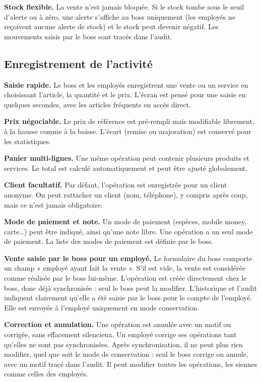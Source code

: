 \documentclass[11pt,a4paper]{article}
\newcommand{\fonc}[2]{\textbf{#1.} #2\par\vspace{0.2em}}
\begin{document}
	\fonc{Stock flexible}{La vente n'est jamais bloquée. Si le stock tombe sous le seuil d'alerte ou à zéro, une alerte s'affiche au boss uniquement (les employés ne reçoivent aucune alerte de stock) et le stock peut devenir négatif. Les mouvements saisis par le boss sont tracés dans l'audit.}

	\subsection{Enregistrement de l'activité}

	\fonc{Saisie rapide}{Le boss et les employés enregistrent une vente ou un service en choisissant l'article, la quantité et le prix. L'écran est pensé pour une saisie en quelques secondes, avec les articles fréquents en accès direct.}

	\fonc{Prix négociable}{Le prix de référence est pré-rempli mais modifiable librement, à la hausse comme à la baisse. L'écart (remise ou majoration) est conservé pour les statistiques.}

	\fonc{Panier multi-lignes}{Une même opération peut contenir plusieurs produits et services. Le total est calculé automatiquement et peut être ajusté globalement.}

	\fonc{Client facultatif}{Par défaut, l'opération est enregistrée pour un client anonyme. On peut rattacher un client (nom, téléphone), y compris après coup, mais ce n'est jamais obligatoire.}

	\fonc{Mode de paiement et note}{Un mode de paiement (espèces, mobile money, carte\dots) peut être indiqué, ainsi qu'une note libre. Une opération a un seul mode de paiement. La liste des modes de paiement est définie par le boss.}

	\fonc{Vente saisie par le boss pour un employé}{Le formulaire du boss comporte un champ « employé ayant fait la vente ». S'il est vide, la vente est considérée comme réalisée par le boss lui-même. L'opération est créée directement chez le boss, donc déjà synchronisée : seul le boss peut la modifier. L'historique et l'audit indiquent clairement qu'elle a été saisie par le boss pour le compte de l'employé. Elle est envoyée à l'employé uniquement en mode conservation.}

	\fonc{Correction et annulation}{Une opération est annulée avec un motif ou corrigée, sans effacement silencieux. Un employé corrige ses opérations tant qu'elles ne sont pas synchronisées. Après synchronisation, il ne peut plus rien modifier, quel que soit le mode de conservation : seul le boss corrige ou annule, avec un motif tracé dans l'audit. Il peut modifier toutes les opérations, les siennes comme celles des employés.}
\end{document}
